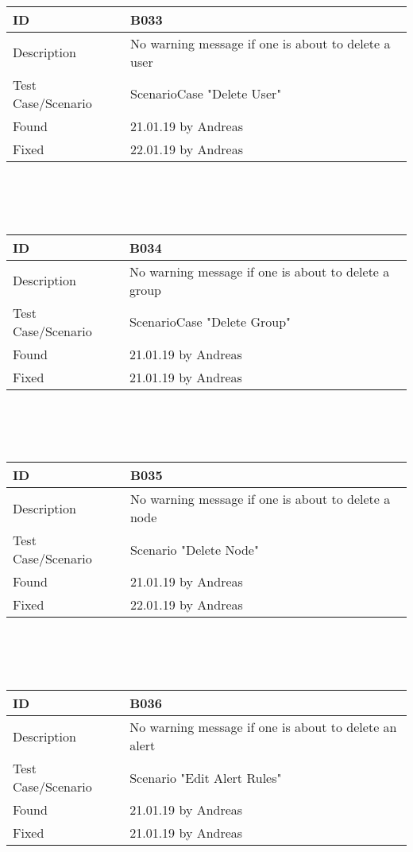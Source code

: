 \documentclass{scrreprt}
\begin{document}
\\ \\ \\
\begin{tabularx}{12cm}{l|X}
ID					& B033 \\
\hline
Description 		& 
No warning message if one is about to delete a user\\
\hline
Test Case/Scenario	& ScenarioCase "Delete User"  \\
\hline
Found				& 21.01.19 by Andreas  \\
\hline
Fixed				& 22.01.19 by Andreas\\ 
\end{tabularx}
\\ \\ \\
\begin{tabularx}{12cm}{l|X}
ID					& B034 \\
\hline
Description 		& 
No warning message if one is about to delete a group\\
\hline
Test Case/Scenario	& ScenarioCase "Delete Group"  \\
\hline
Found				& 21.01.19 by Andreas  \\
\hline
Fixed				& 21.01.19 by Andreas  \\ 
\end{tabularx}
\\ \\ \\
\begin{tabularx}{12cm}{l|X}
ID					& B035 \\
\hline
Description 		& 
No warning message if one is about to delete a node\\
\hline
Test Case/Scenario	& Scenario "Delete Node"  \\
\hline
Found				& 21.01.19 by Andreas  \\
\hline
Fixed				& 22.01.19 by Andreas  \\ 
\end{tabularx}
\\ \\ \\
\begin{tabularx}{12cm}{l|X}
ID					& B036 \\
\hline
Description 		& 
No warning message if one is about to delete an alert\\
\hline
Test Case/Scenario	& Scenario "Edit Alert Rules" \\
\hline
Found				& 21.01.19 by Andreas  \\
\hline
Fixed				& 21.01.19 by Andreas  \\ 
\end{tabularx}
\end{document}
